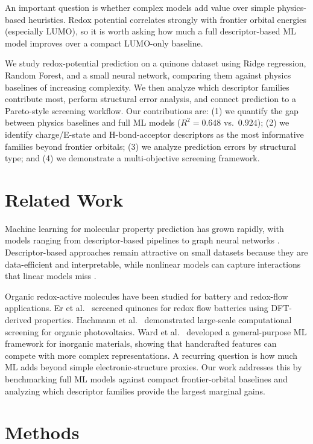 \documentclass[11pt]{article}
\begin{document}
An important question is whether complex models add value over simple physics-based heuristics. Redox potential correlates strongly with frontier orbital energies (especially LUMO), so it is worth asking how much a full descriptor-based ML model improves over a compact LUMO-only baseline.

We study redox-potential prediction on a quinone dataset using Ridge regression, Random Forest, and a small neural network, comparing them against physics baselines of increasing complexity. We then analyze which descriptor families contribute most, perform structural error analysis, and connect prediction to a Pareto-style screening workflow. Our contributions are: (1) we quantify the gap between physics baselines and full ML models ($R^2 = 0.648$ vs.\ $0.924$); (2) we identify charge/E-state and H-bond-acceptor descriptors as the most informative families beyond frontier orbitals; (3) we analyze prediction errors by structural type; and (4) we demonstrate a multi-objective screening framework.

\section{Related Work}

Machine learning for molecular property prediction has grown rapidly, with models ranging from descriptor-based pipelines to graph neural networks \cite{butler2018, wu2018}. Descriptor-based approaches remain attractive on small datasets because they are data-efficient and interpretable, while nonlinear models can capture interactions that linear models miss \cite{gilmer2017}.

Organic redox-active molecules have been studied for battery and redox-flow applications. Er et al.\ \cite{er2014} screened quinones for redox flow batteries using DFT-derived properties. Hachmann et al.\ \cite{hachmann2011} demonstrated large-scale computational screening for organic photovoltaics. Ward et al.\ \cite{ward2018} developed a general-purpose ML framework for inorganic materials, showing that handcrafted features can compete with more complex representations. A recurring question is how much ML adds beyond simple electronic-structure proxies. Our work addresses this by benchmarking full ML models against compact frontier-orbital baselines and analyzing which descriptor families provide the largest marginal gains.

\section{Methods}
\end{document}
